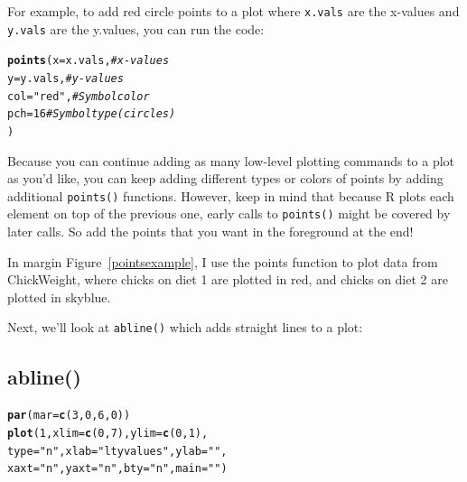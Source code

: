 \documentclass{tufte-book}\usepackage[]{graphicx}\usepackage[]{color}
\makeatletter
\newcommand{\hlnum}[1]{\textcolor[rgb]{0.686,0.059,0.569}{#1}}%
\newcommand{\hlstr}[1]{\textcolor[rgb]{0.192,0.494,0.8}{#1}}%
\newcommand{\hlcom}[1]{\textcolor[rgb]{0.678,0.584,0.686}{\textit{#1}}}%
\newcommand{\hlstd}[1]{\textcolor[rgb]{0.345,0.345,0.345}{#1}}%
\newcommand{\hlkwc}[1]{\textcolor[rgb]{0.333,0.667,0.333}{#1}}%
\newcommand{\hlkwd}[1]{\textcolor[rgb]{0.737,0.353,0.396}{\textbf{#1}}}%
\newenvironment{kframe}{%
 \def\at@end@of@kframe{}%
 \ifinner\ifhmode%
  \def\at@end@of@kframe{\end{minipage}}%
  \begin{minipage}{\columnwidth}%
 \fi\fi%
 \def\FrameCommand##1{\hskip\@totalleftmargin \hskip-\fboxsep
 \colorbox{shadecolor}{##1}\hskip-\fboxsep
     \hskip-\linewidth \hskip-\@totalleftmargin \hskip\columnwidth}%
 \MakeFramed {\advance\hsize-\width
   \@totalleftmargin\z@ \linewidth\hsize
   \@setminipage}}%
 {\par\unskip\endMakeFramed%
 \at@end@of@kframe}
\newenvironment{knitrout}{}{} %
\makeatother
\begin{document}
\begin{footnotesize}
{{\begin{description}
  
\end{description}

}
}
\vspace{5mm} %


For example, to add red circle points to a plot where \texttt{x.vals} are the x-values and \texttt{y.vals} are the y.values, you can run the code:

\begin{knitrout}
\color{fgcolor}\begin{kframe}
\begin{alltt}
\hlkwd{points}\hlstd{(}\hlkwc{x} \hlstd{= x.vals,} \hlcom{# x-values}
       \hlkwc{y} \hlstd{= y.vals,} \hlcom{# y-values}
       \hlkwc{col} \hlstd{=} \hlstr{"red"}\hlstd{,} \hlcom{# Symbol color}
       \hlkwc{pch} \hlstd{=} \hlnum{16} \hlcom{# Symbol type (circles)}
       \hlstd{)}
\end{alltt}
\end{kframe}
\end{knitrout}

Because you can continue adding as many low-level plotting commands to a plot as you'd like, you can keep adding different types or colors of points by adding additional \texttt{points()} functions. However, keep in mind that because R plots each element on top of the previous one, early calls to \texttt{points()} might be covered by later calls. So add the points that you want in the foreground at the end!

In margin Figure~\ref{pointsexample}, I use the points function to plot data from ChickWeight, where chicks on diet 1 are plotted in red, and chicks on diet 2 are plotted in skyblue.

Next, we'll look at \texttt{abline()} which adds straight lines to a plot:


\subsection{abline()}

\begin{marginfigure}
\begin{tiny}
\begin{knitrout}
\color{fgcolor}\begin{kframe}
\begin{alltt}
\hlkwd{par}\hlstd{(}\hlkwc{mar} \hlstd{=} \hlkwd{c}\hlstd{(}\hlnum{3}\hlstd{,} \hlnum{0}\hlstd{,} \hlnum{6}\hlstd{,} \hlnum{0}\hlstd{))}
\hlkwd{plot}\hlstd{(}\hlnum{1}\hlstd{,} \hlkwc{xlim} \hlstd{=} \hlkwd{c}\hlstd{(}\hlnum{0}\hlstd{,} \hlnum{7}\hlstd{),} \hlkwc{ylim} \hlstd{=} \hlkwd{c}\hlstd{(}\hlnum{0}\hlstd{,} \hlnum{1}\hlstd{),}
     \hlkwc{type} \hlstd{=} \hlstr{"n"}\hlstd{,} \hlkwc{xlab} \hlstd{=} \hlstr{"lty values"}\hlstd{,} \hlkwc{ylab} \hlstd{=} \hlstr{""}\hlstd{,}
     \hlkwc{xaxt} \hlstd{=} \hlstr{"n"}\hlstd{,} \hlkwc{yaxt} \hlstd{=} \hlstr{"n"}\hlstd{,} \hlkwc{bty} \hlstd{=} \hlstr{"n"}\hlstd{,} \hlkwc{main} \hlstd{=} \hlstr{""}\hlstd{)}


\end{alltt}
\end{kframe}
\end{knitrout}
\end{tiny}
\end{marginfigure}
\end{footnotesize}
\end{document}
